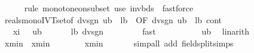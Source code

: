 \begin{isabellebody}
\ \ \ \ \isamarkupfalse%
\ {\isacharparenleft}{\kern0pt}rule\ monotone{\isacharunderscore}{\kern0pt}on{\isacharunderscore}{\kern0pt}subset{\isacharparenright}{\kern0pt}\ {\isacharparenleft}{\kern0pt}use\ invbds\ \ fastforce{\isacharparenright}{\kern0pt}\isanewline
\isanewline
\ \ \isamarkupfalse%
\ real{\isacharunderscore}{\kern0pt}smono{\isacharunderscore}{\kern0pt}IVT{\isacharprime}{\kern0pt}{\isacharunderscore}{\kern0pt}set{\isacharbrackleft}{\kern0pt}of\ dvsgn\ {\isachardoublequoteopen}{}{\isacharslash}{\kern0pt}ub{\isachardoublequoteclose}\ {}\ {\isachardoublequoteopen}{}{\isacharslash}{\kern0pt}lb{\isachardoublequoteclose}\ {\isacharcomma}{\kern0pt}\ OF\ dvsgn{\isacharparenleft}{\kern0pt}{}{\isacharcomma}{\kern0pt}{}{\isacharparenright}{\kern0pt}\ {\isacartoucheopen}{}{\isacharslash}{\kern0pt}ub\ {\isasymle}\ {}{\isacharslash}{\kern0pt}lb{\isacartoucheclose}\ cont{\isacharbrackright}{\kern0pt}\isanewline
\ \ \isamarkupfalse%
\ {\isasymxi}\ \ xi{\isacharcolon}{\kern0pt}\ {\isachardoublequoteopen}{}\ {\isacharslash}{\kern0pt}\ ub\ {\isasymle}\ {\isasymxi}{\isachardoublequoteclose}\ {\isachardoublequoteopen}{\isasymxi}\ {\isasymle}\ {}\ {\isacharslash}{\kern0pt}\ lb{\isachardoublequoteclose}\ {\isachardoublequoteopen}dvsgn\ {\isasymxi}\ {\isacharequal}{\kern0pt}\ {}{\isachardoublequoteclose}\isanewline
\ \ \ \ \isamarkupfalse%
\ fast\isanewline
\ \ \isamarkupfalse%
\ {\isachardoublequoteopen}{}\ {\isacharless}{\kern0pt}\ {\isasymxi}{\isachardoublequoteclose}\ \isamarkupfalse%
\ {\isacartoucheopen}{}\ {\isacharless}{\kern0pt}\ {}{\isacharslash}{\kern0pt}ub{\isacartoucheclose}\ \isamarkupfalse%
\ linarith\isanewline
\ \ \isamarkupfalse%
\ xmin\ \ {\isachardoublequoteopen}xmin\ {\isasymequiv}\ {}{\isacharslash}{\kern0pt}{\isasymxi}{\isachardoublequoteclose}\isanewline
\ \ \isamarkupfalse%
\ {\isachardoublequoteopen}{}\ {\isacharless}{\kern0pt}\ xmin{\isachardoublequoteclose}\ \isamarkupfalse%
\ {\isacartoucheopen}{}\ {\isacharless}{\kern0pt}\ {\isasymxi}{\isacartoucheclose}\ \isamarkupfalse%
\ {\isacharparenleft}{\kern0pt}simp{\isacharunderscore}{\kern0pt}all\ add{\isacharcolon}{\kern0pt}\ field{\isacharunderscore}{\kern0pt}split{\isacharunderscore}{\kern0pt}simps{\isacharparenright}{\kern0pt}\isanewline

\end{isabellebody}
